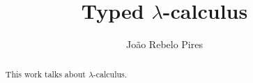 \documentclass{llncs}
\begin{document}
	\title{Typed $\lambda$-calculus}

	\author{João Rebelo Pires}


	\maketitle

	\begin{abstract}
	
		This work talks about $\lambda$-calculus.


	\end{abstract}
\end{document}
